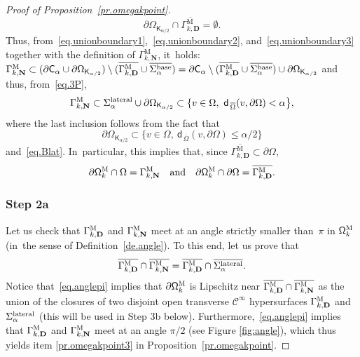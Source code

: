 \documentclass[10pt]{amsart}
\newcommand{\quand}{\quad\text{and}\quad}
\newcommand{\mbf}[1]{\mathbf{#1}}
\let\pa\partial
\theoremstyle{plain}
\theoremstyle{definition}
\begin{document}
\begin{proof}[Proof of Proposition~\ref{pr.omegakpoint}]
\begin{equation}
\partial \Omega_{\mathsf K_{\alpha/2}}\cap \overline{\Gamma_{k,\mbf D}^{\text{M}}}=\emptyset.
\end{equation}
Thus, from~\eqref{eq.unionboundary1},~\eqref{eq.unionboundary2}, and~\eqref{eq.unionboundary3} together with the definition of $\Gamma_{k,\mbf N}^{\text{M}}$, it~holds: $\Gamma_{k,\mbf N}^{\text{M}} \subset (\pa \mathsf C_\alpha \cup \partial \Omega_{\mathsf K_{\alpha/2}})\setminus (\overline{\Gamma_{k,\mbf D}^{\text{M}}}\cup \overline{ \Sigma_\alpha^{\textup{base}}}) = \pa \mathsf C_\alpha \setminus (\overline{\Gamma_{k,\mbf D}^{\text{M}}}\cup \overline{ \Sigma_\alpha^{\textup{base}}}) \cup \partial \Omega_{\mathsf K_{\alpha/2}}$ and thus, from~\eqref{eq.3P},
\begin{equation}\label{eq.GK2}
\Gamma_{k,\mbf N}^{\text{M}} \subset \Sigma_\alpha^{\textup{lateral}} \cup \partial \Omega_{\mathsf K_{\alpha/2}} \subset \{v\in \Omega, \ \mathsf d_{\, \overline \Omega}(v,\partial \Omega)< {\alpha} \big \},
\end{equation}
where the last inclusion follows from the fact that
\[
\partial \Omega_{\mathsf K_{\alpha/2}}\subset \{v\in \Omega, \ \mathsf d_{\, \overline \Omega}(v,\partial \Omega)\le \alpha / {2}\big \}
\]
and~\eqref{eq.Blat}. In~particular, this implies that, since $\overline{\Gamma_{k,\mbf D}^{\text{M}}}\subset \partial \Omega$,
\begin{equation}\label{eq.onm}
\pa \mathsf \Omega_k^{\textsc{M}} \cap \Omega =\Gamma_{k,\mbf N}^{\text{M}} \quand \pa \mathsf \Omega_k^{\textsc{M}} \cap \partial \Omega = \overline{\Gamma_{k,\mbf D}^{\text{M}}}.
\end{equation}


\subsubsection*{Step 2a} Let us check that $\Gamma_{k,\mbf
D}^{\textsc{M}} $ and $\Gamma_{k,\mbf N}^{\textsc{M}}$ meet
at an angle strictly smaller than~$\pi$ in $\mathsf
\Omega_k^{\textsc{M}}$ (in~the sense of Definition~\ref{de.angle}). To this end, let us prove that
\begin{equation}\label{eq.anglepi}
\overline{\Gamma_{k,\mbf D}^{\textsc{M}} }\cap \overline{\Gamma_{k,\mbf N}^{\textsc{M}}}=\overline{\Gamma_{k,\mbf D}^{\textsc{M}} }\cap \overline{\Sigma_\alpha^{\textup{lateral}}}.
\end{equation}
Notice that~\eqref{eq.anglepi} implies that $\pa \mathsf
\Omega_k^{\textsc{M}}$ is Lipschitz near
$\overline{\Gamma_{k,\mbf D}^{\textsc{M}} }\cap
\overline{\Gamma_{k,\mbf N}^{\textsc{M}}}$ as the union of
the closures of two disjoint open transverse $\mathcal
C^\infty$ hypersurfaces $\Gamma_{k,\mbf D}^{\textsc{M}}$ and
$\Sigma_\alpha^{\textup{lateral}}$ (this will be used in Step 3b below). Furthermore,~\eqref{eq.anglepi}
implies that $\Gamma_{k,\mbf D}^{\textsc{M}} $ and
$\Gamma_{k,\mbf N}^{\textsc{M}}$ meet at an angle $\pi/2$
(see Figure \ref{fig:angle}), which thus yields item \eqref{pr.omegakpoint3} in Proposition~\ref{pr.omegakpoint}.


\end{proof}
\end{document}
